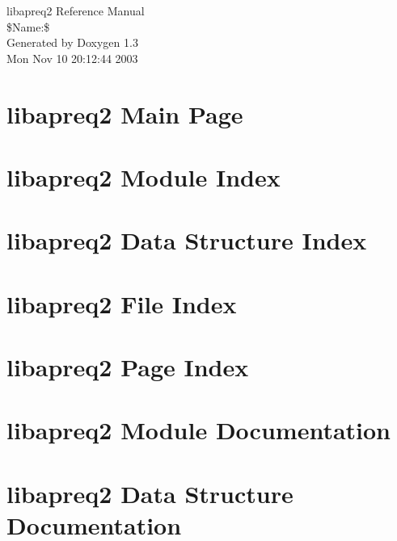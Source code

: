\documentclass[a4paper]{book}
\begin{document}
\begin{titlepage}
\vspace*{7cm}
\begin{center}
{\Large libapreq2 Reference Manual\\[1ex]\large \$Name:\$}\\
\vspace*{1cm}
{\large Generated by Doxygen 1.3}\\
\vspace*{0.5cm}
{\small Mon Nov 10 20:12:44 2003}\\
\end{center}
\end{titlepage}
\clearemptydoublepage
{}
\tableofcontents
\clearemptydoublepage
{}
\chapter{libapreq2 Main Page}
\label{index}
\chapter{libapreq2 Module Index}

\chapter{libapreq2 Data Structure Index}

\chapter{libapreq2 File Index}

\chapter{libapreq2 Page Index}

\chapter{libapreq2 Module Documentation}

















\chapter{libapreq2 Data Structure Documentation}








\end{document}
